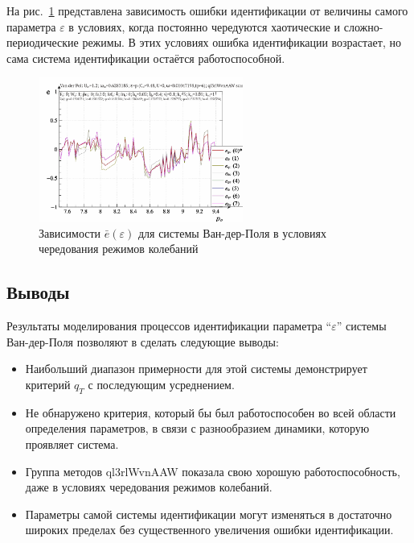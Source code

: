 На  рис.~\ref{atu:f:vdp_e_varepsilon_2} представлена зависимость ошибки идентификации
от величины самого параметра $\varepsilon$ в условиях,
когда постоянно чередуются хаотические и сложно-периодические режимы.
В этих условиях ошибка идентификации возрастает,
но сама система идентификации остаётся работоспособной.


\begin{figure}[ht!]
\begin{center}
  \includegraphics[width=0.60\textwidth]{p/cha/vdp/vdp_id2-p_p_e_ql3rlWvnAAW_scan.png}
\end{center}
  \caption{Зависимости $\bar{e}(\varepsilon)$ для системы Ван-дер-Поля в условиях чередования режимов колебаний}
\label{atu:f:vdp_e_varepsilon_2}
\end{figure}


\subsection{Выводы}  %

Результаты моделирования
процессов идентификации параметра ``$\varepsilon$''
системы Ван-дер-Поля
позволяют в сделать следующие выводы:

\begin{itemize}

  \item
    Наибольший диапазон примерности для этой системы
    демонстрирует критерий $q_T$ с последующим усреднением.

  \item
    Не обнаружено критерия, который бы был работоспособен во всей
    области определения параметров, в связи с разнообразием динамики,
    которую проявляет система.

  \item
    Группа методов ql3rlWvnAAW показала свою хорошую работоспособность,
    даже в условиях чередования режимов колебаний.

  \item
    Параметры самой системы идентификации могут изменяться в достаточно широких
    пределах без существенного увеличения ошибки идентификации.

\end{itemize}





